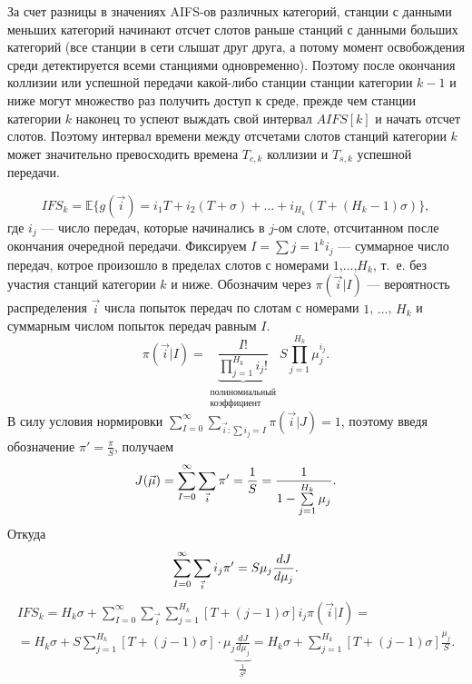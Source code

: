 За счет разницы в значениях AIFS-ов различных категорий, станции с данными меньших категорий начинают отсчет слотов раньше станций с данными больших категорий (все станции в сети слышат друг друга, а потому момент освобождения среди детектируется всеми станциями одновременно). Поэтому после окончания коллизии или успешной передачи какой-либо станции станции категории $k-1$ и ниже могут множество раз получить доступ к среде, прежде чем станции категории $k$ наконец то успеют выждать свой интервал $AIFS[k]$ и начать отсчет слотов. Поэтому интервал времени между отсчетами слотов станций категории $k$ может значительно превосходить времена $T_{c,k}$ коллизии и $T_{s,k}$ успешной передачи.

\begin{equation}
IFS_k = \mathbb{E}\{g(\vec{i}) = i_1T+i_2(T+\sigma) + \dots + i_{H_k}(T+(H_k-1)\sigma)\},
\end{equation}
где $i_j$ --- число передач, которые начинались в $j$-ом слоте, отсчитанном после окончания очередной передачи. Фиксируем $I=\sum\limits{j=1}^{k}i_j$ --- суммарное число передач, котрое произошло в пределах слотов с номерами $1$,$\dots$,$H_k$, т.~е. без участия станций категории $k$ и ниже.
Обозначим через $\pi(\vec{i}|I)$ --- вероятность распределения $\vec{i}$ числа попыток передач по слотам с номерами $1$, $\dots$, $H_k$ и суммарным числом попыток передач равным $I$.
\begin{equation}
\pi(\vec{i}|I) = \underbrace{\frac{I!}{\prod\limits_{j=1}^{H_k}i_j!}}_{\substack{\text{полиномиальный}\\ \text{коэффициент}}} S\prod\limits_{j=1}^{H_k} \mu_j^{i_j}.
\end{equation}
В силу условия нормировки $\sum\limits_{I = 0}^{\infty}\sum\limits_{\vec{i}\colon\sum\limits i_j = I}\pi(\vec{i}|J) = 1$, поэтому введя обозначение $\pi'=\frac{\pi}{S}$, получаем
\begin{equation}
\notag
J(\vec{\mu}) = \sum\limits_{I = 0}^{\infty}\sum\limits_{\vec{i}} \pi' = \frac{1}{S} = \frac{1}{1-\sum\limits_{j=1}^{H_k} \mu_j}.
\end{equation}
Откуда 
\begin{equation}
\notag
\sum\limits_{I = 0}^{\infty}\sum\limits_{\vec{i}} i_j\pi' = S\mu_j\frac{dJ}{d\mu_j}.
\end{equation}
\begin{gather}
IFS_k = H_k\sigma + \sum\limits_{I = 0}^{\infty} \sum\limits_{\vec{i}} \sum\limits_{j=1}^{H_k} [T+(j-1)\sigma]i_j\pi(\vec{i}|I) = \\ = H_k\sigma + 
S\sum\limits_{j=1}^{H_k}[T+(j-1)\sigma] \cdot \mu_j \underbrace{\frac{dJ}{d\mu_j}}_{\frac{1}{S^2}} = H_k \sigma + \sum\limits_{j=1}^{H_k}[T+(j-1)\sigma]\frac{\mu_j}{S}.
\end{gather}